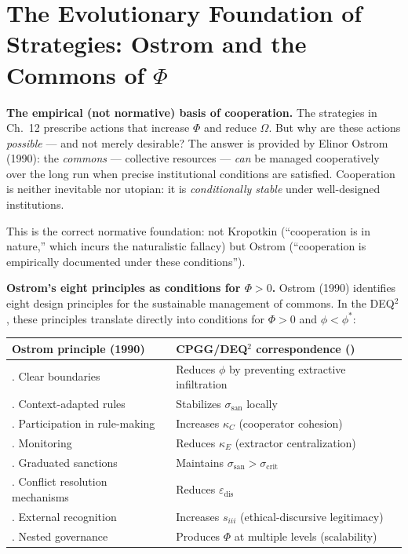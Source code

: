 \section{The Evolutionary Foundation of Strategies: Ostrom and the Commons of \(\Phi\)}\label{il-fondamento-evolutivo-delle-strategie}

\Proved{} \textbf{The empirical (not normative) basis of cooperation.}
The strategies in Ch.~12 prescribe actions that increase $\Phi$ and
reduce $\Omega$. But why are these actions \emph{possible} --- and not
merely desirable? The answer is provided by Elinor Ostrom (1990): the
\emph{commons} --- collective resources --- \emph{can} be managed
cooperatively over the long run when precise institutional conditions are
satisfied. Cooperation is neither inevitable nor utopian: it is
\emph{conditionally stable} under well-designed institutions.

This is the correct normative foundation: not Kropotkin (``cooperation
is in nature,'' which incurs the naturalistic fallacy) but Ostrom
(``cooperation is empirically documented under these conditions'').

\Hypoth{} \textbf{Ostrom's eight principles as conditions for
\(\Phi > 0\).} Ostrom (1990) identifies eight design principles for the
sustainable management of commons. In the DEQ$^2$, these principles
translate directly into conditions for $\Phi > 0$ and $\phi < \phi^*$:

{\def\LTcaptype{none}
{\small\begin{longtable}[]{@{}
  >{\raggedright\arraybackslash}p{}
  >{\raggedright\arraybackslash}p{}@{}}
\toprule\noalign{}
\begin{minipage}[b]{\linewidth}\raggedright
Ostrom principle (1990)
\end{minipage} & \begin{minipage}[b]{\linewidth}\raggedright
CPGG/DEQ$^2$ correspondence (\Hypoth{})
\end{minipage} \\
\midrule\noalign{}
\endhead
\bottomrule\noalign{}
\endlastfoot
1. Clear boundaries & Reduces $\phi$ by preventing extractive infiltration \\
2. Context-adapted rules & Stabilizes $\sigma_{\text{san}}$ locally \\
3. Participation in rule-making & Increases $\kappa_C$ (cooperator cohesion) \\
4. Monitoring & Reduces $\kappa_E$ (extractor centralization) \\
5. Graduated sanctions & Maintains $\sigma_{\text{san}} > \sigma_{\text{crit}}$ \\
6. Conflict resolution mechanisms & Reduces $\varepsilon_{\text{dis}}$ \\
7. External recognition & Increases $s_{iii}$ (ethical-discursive legitimacy) \\
8. Nested governance & Produces $\Phi$ at multiple levels (scalability) \\
\end{longtable}}
}

